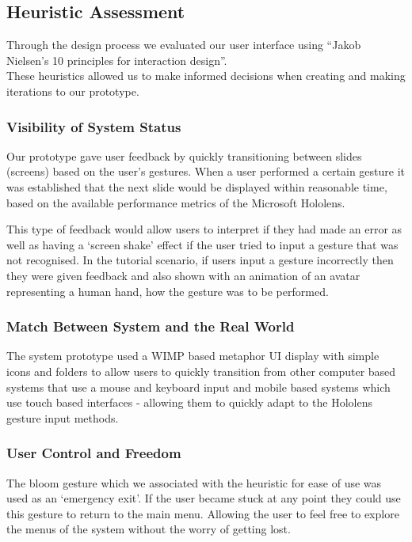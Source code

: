 \documentclass{article}
\begin{document}
        \subsection{Heuristic Assessment}
            Through the design process we evaluated our user interface using 
            “Jakob Nielsen’s 10 principles for interaction design”. 
            \\
            These heuristics allowed us to make informed decisions when creating 
            and making iterations to our prototype.

            \subsubsection{Visibility of System Status}
                Our prototype gave user feedback by quickly transitioning between 
                slides (screens) based on the user’s gestures. When a user 
                performed a certain gesture it was established that the next 
                slide would be displayed within reasonable time, based on the 
                available performance metrics of the Microsoft Hololens.
                \par
                This type of feedback would allow users to interpret if they had 
                made an error as well as having a ‘screen shake’ effect if the 
                user tried to input a gesture that was not recognised. In the 
                tutorial scenario, if users input a gesture incorrectly then 
                they were given feedback and also shown with an animation of an 
                avatar representing a human hand, how the gesture was to be performed.

            \subsubsection{Match Between System and the Real World}
                The system prototype used a WIMP based metaphor UI display with 
                simple icons and folders to allow users to quickly transition from 
                other computer based systems that use a mouse and keyboard input and 
                mobile based systems which use touch based interfaces - allowing them 
                to quickly adapt to the Hololens gesture input methods.

            \subsubsection{User Control and Freedom}
                The bloom gesture which we associated with the heuristic for ease 
                of use was used as an ‘emergency exit’. If the user became stuck 
                at any point they could use this gesture to return to the main menu. 
                Allowing the user to feel free to explore the menus of the system 
                without the worry of getting lost.
\end{document}
